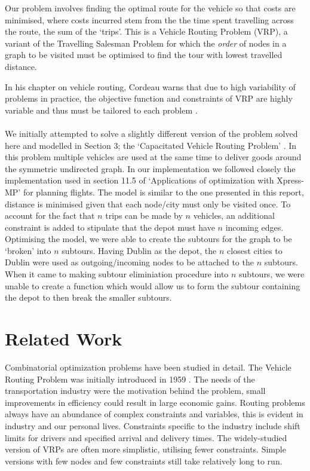 \documentclass[a4paper,11pt]{article}
\begin{document}
Our problem involves finding the optimal route for the vehicle so that costs are minimised, where costs incurred stem from the the time spent travelling across the route, the sum of the `trips'. This is a Vehicle Routing Problem (VRP), a variant of the Travelling Salesman Problem for which the \textit{order} of nodes in a graph to be visited must be optimised to find the tour with lowest travelled distance. 

In his chapter on vehicle routing, Cordeau warns that due to high variability of problems in practice, the objective function and constraints of VRP are highly variable and thus must be tailored to each problem \cite{cordeau2007vehicle}.
\\\\
We initially attempted to solve a slightly different version of the problem solved here and modelled in Section 3; the `Capacitated Vehicle Routing Problem' \cite{toth2002models}. In this problem multiple vehicles are used at the same time to deliver goods around the symmetric undirected graph. In our implementation we followed closely the implementation used in section 11.5 of  `Applications of optimization with Xpress-MP'  \cite{gueret1999applications} for planning flights. The model is similar to the one presented in this report, distance is minimised given that each node/city must only be visited once. To account for the fact that $n$ trips can be made by $n$ vehicles, an additional constraint is added to stipulate that the depot must have $n$ incoming edges. Optimising the model, we were able to create the subtours for the graph to be `broken' into $n$ subtours. Having Dublin as the depot, the $n$ closest cities to Dublin were used as outgoing/incoming nodes to be attached to the $n$ subtours. When it came to making subtour eliminiation procedure into $n$ subtours, we were unable to create a function which would allow us to form the subtour containing the depot to then break the smaller subtours.



\section{Related Work}
Combinatorial optimization problems have been studied in detail.  The Vehicle Routing Problem was initially introduced in 1959 \cite{dantzig1959truck}. The needs of the transportation industry were the motivation behind the problem, small improvements in efficiency could result in large economic gains. Routing problems always have an abundance of complex constraints and variables, this is evident in industry and our personal lives. Constraints specific to the industry include shift limits for drivers and specified arrival and delivery times. The widely-studied version of VRPs are often more simplistic, utilising fewer constraints. Simple versions with few nodes and few constraints still take relatively long to run.
\end{document}
